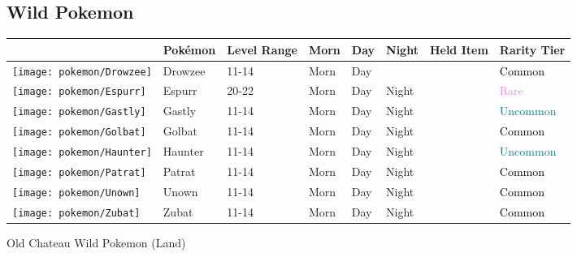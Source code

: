 \subsection{Wild Pokemon}%
\label{subsec:WildPokemon}%
\begin{longtable}{||l l l l l l l l||}%
\hline%
&Pokémon&Level Range&Morn&Day&Night&Held Item&Rarity Tier\\%
\hline%
\endhead%
\hline%
\texttt{[image: pokemon/Drowzee]}&Drowzee&11{-}14&Morn&Day&&&\textcolor{black}{%
Common%
}\\%
\hline%
\texttt{[image: pokemon/Espurr]}&Espurr&20{-}22&Morn&Day&Night&&\textcolor{violet}{%
Rare%
}\\%
\hline%
\texttt{[image: pokemon/Gastly]}&Gastly&11{-}14&Morn&Day&Night&&\textcolor{teal}{%
Uncommon%
}\\%
\hline%
\texttt{[image: pokemon/Golbat]}&Golbat&11{-}14&Morn&Day&Night&&\textcolor{black}{%
Common%
}\\%
\hline%
\texttt{[image: pokemon/Haunter]}&Haunter&11{-}14&Morn&Day&Night&&\textcolor{teal}{%
Uncommon%
}\\%
\hline%
\texttt{[image: pokemon/Patrat]}&Patrat&11{-}14&Morn&Day&Night&&\textcolor{black}{%
Common%
}\\%
\hline%
\texttt{[image: pokemon/Unown]}&Unown&11{-}14&Morn&Day&Night&&\textcolor{black}{%
Common%
}\\%
\hline%
\texttt{[image: pokemon/Zubat]}&Zubat&11{-}14&Morn&Day&Night&&\textcolor{black}{%
Common%
}\\%
\hline%
\end{longtable}%
\caption{Old Chateau Wild Pokemon (Land)}%
